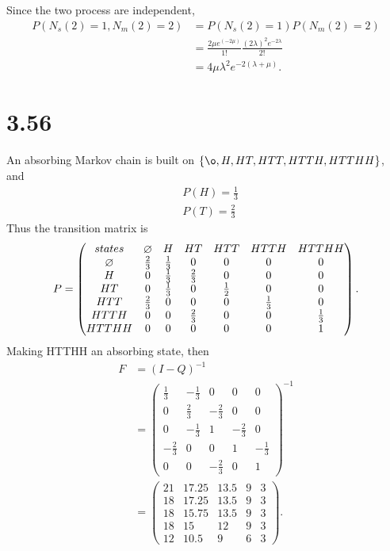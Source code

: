 \documentclass{article}
\begin{document}
\subsection{}
Since the two process are independent, 
\begin{align*}
    P(N_s(2)=1,N_m(2)=2)&=P(N_s(2)=1)P(N_m(2)=2)\\
    &= \frac{2\mu e^(-2\mu)}{1!}\frac{(2\lambda)^2e^{-2\lambda}}{2!} \\
    &= 4\mu \lambda^2 e^{-2(\lambda+\mu)}.
\end{align*}

\section{3.56}
An absorbing Markov chain is built on $\{\o, H, HT, HTT, HTTH, HTTHH\}$, and
\begin{align*}
    &P(H)=\frac{1}{3} \\
    &P(T)=\frac{2}{3}
\end{align*}
Thus the transition matrix is
\begin{align*}
    P=
    \begin{pmatrix}
    states&\o&H&HT&HTT&HTTH&HTTHH\\
    \o&\frac{2}{3}&\frac{1}{3}&0&0&0&0\\
    H&0&\frac{1}{3}&\frac{2}{3}&0&0&0\\
    HT&0&\frac{1}{3}&0&\frac{1}{2}&0&0\\
    HTT&\frac{2}{3}&0&0&0&\frac{1}{3}&0\\
    HTTH&0&0&\frac{2}{3}&0&0&\frac{1}{3}\\
    HTTHH&0&0&0&0&0&1
    \end{pmatrix}.
\end{align*}
Making HTTHH an absorbing state, then
\begin{align*}
    F&=(I-Q)^{-1}\\
    &=
    \begin{pmatrix}
    \frac{1}{3}&-\frac{1}{3}&0&0&0 \\
    0&\frac{2}{3}&-\frac{2}{3}&0&0 \\
    0&-\frac{1}{3}&1&-\frac{2}{3}&0 \\
    -\frac{2}{3}&0&0&1&-\frac{1}{3} \\
    0&0&-\frac{2}{3}&0&1
    \end{pmatrix}^{-1}\\
    &= 
    \begin{pmatrix}
    21&17.25&13.5&9&3\\
    18&17.25&13.5&9&3\\
    18&15.75&13.5&9&3\\
    18&15&12&9&3\\
    12&10.5&9&6&3
    \end{pmatrix}.
\end{align*}
\end{document}
